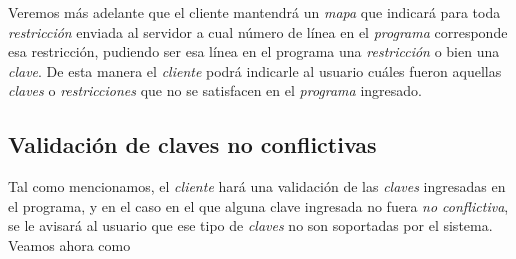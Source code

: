 \documentclass[11pt,a4paper,twoside]{tesis}
\begin{document}
Veremos más adelante que el cliente mantendrá un \textit{mapa} que indicará para toda \textit{restricción} enviada al servidor a cual número de línea en el \textit{programa} corresponde esa restricción, pudiendo ser esa línea en el programa una \textit{restricción} o bien una \textit{clave}. De esta manera el \textit{cliente} podrá indicarle al usuario cuáles fueron aquellas \textit{claves} o \textit{restricciones} que no se satisfacen en el \textit{programa} ingresado.

\subsection{Validación de claves no conflictivas}
Tal como mencionamos, el \textit{cliente} hará una validación de las \textit{claves} ingresadas en el programa, y en el caso en el que alguna clave ingresada no fuera \textit{no conflictiva}, se le avisará al usuario que ese tipo de \textit{claves} no son soportadas por el sistema. Veamos ahora como 
\end{document}
